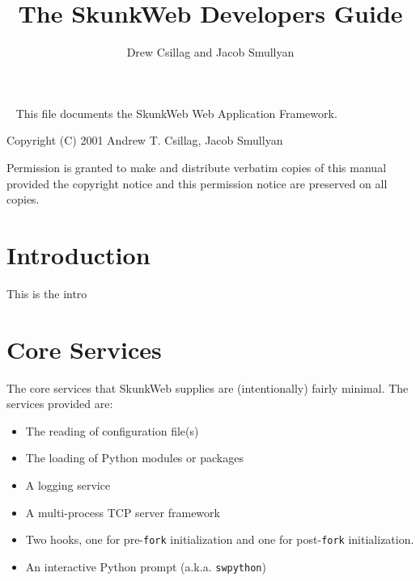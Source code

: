 \documentclass{manual}
\title{The SkunkWeb Developers Guide}
\author{Drew Csillag and Jacob Smullyan}
\begin{document}
\newcommand{\Location}{\texttt{Location}}
\newcommand{\PAR}{\texttt{par}}
\newcommand{\mskunkroot}[1]{\textit{SkunkRoot}\texttt{#1}}
\newcommand{\swpython}{\texttt{swpython}}
\newcommand{\connection}{\texttt{Connection}}
\newcommand{\NOTE}[1]{\textbf{\Large #1}}
\newcommand{\None}{\texttt{None}}
\newcommand{\nolocation}{[N]}


\newcommand{\argdescitem}[1]{\hspace\labelsep
                                \normalfont\ttfamily #1\ }
\newenvironment{argdesc}{\begin{list}{}{
        \renewcommand{\makelabel}{\argdescitem}
}
}{\end{list}}

\maketitle
\ 
\vfill 
\noindent
This file documents the SkunkWeb Web Application Framework.

\noindent
Copyright (C) 2001 Andrew T. Csillag, Jacob Smullyan

\noindent
Permission is granted to make and distribute verbatim copies of
this manual provided the copyright notice and this permission notice
are preserved on all copies.


\tableofcontents

\chapter{Introduction}
This is the intro

\chapter{Core Services}
The core services that SkunkWeb supplies are (intentionally) fairly minimal. 
The services provided are:
\begin{itemize}
\item The reading of configuration file(s)
\item The loading of Python modules or packages
\item A logging service
\item A multi-process TCP server framework
\item Two hooks, one for pre-\texttt{fork} initialization and one for
post-\texttt{fork} initialization.
\item An interactive Python prompt (a.k.a. \texttt{swpython})
\end{itemize}
\end{document}
